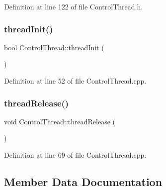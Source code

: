 Definition at line 122 of file Control\+Thread.\+h.

\hypertarget{classocra__recipes_1_1ControlThread_ad4a51369f70181e22a3ee4980a5abd13}{}\label{classocra__recipes_1_1ControlThread_ad4a51369f70181e22a3ee4980a5abd13} 
\subsubsection{\texorpdfstring{thread\+Init()}{threadInit()}}
{\footnotesize\ttfamily bool Control\+Thread\+::thread\+Init (\begin{DoxyParamCaption}{ }\end{DoxyParamCaption})\hspace{0.3cm}{\ttfamily [virtual]}}



Definition at line 52 of file Control\+Thread.\+cpp.

\hypertarget{classocra__recipes_1_1ControlThread_a62c6401278b62bd291722d7652ace6af}{}\label{classocra__recipes_1_1ControlThread_a62c6401278b62bd291722d7652ace6af} 
\subsubsection{\texorpdfstring{thread\+Release()}{threadRelease()}}
{\footnotesize\ttfamily void Control\+Thread\+::thread\+Release (\begin{DoxyParamCaption}{ }\end{DoxyParamCaption})\hspace{0.3cm}{\ttfamily [virtual]}}



Definition at line 69 of file Control\+Thread.\+cpp.



\subsection{Member Data Documentation}
\hypertarget{classocra__recipes_1_1ControlThread_a31d18ca1b7ac0c1dfd4a285bfd1fb7f7}{}\label{classocra__recipes_1_1ControlThread_a31d18ca1b7ac0c1dfd4a285bfd1fb7f7} 
